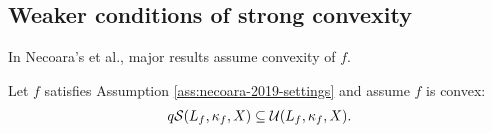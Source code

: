 \documentclass[12pt]{report}
\begin{document}
        \subsection{Weaker conditions of strong convexity}
            In Necoara's et al., major results assume convexity of $f$. 
            \begin{theorem}\label{thm:qscnvx-means-qua}
                Let $f$ satisfies Assumption \ref{ass:necoara-2019-settings} and assume $f$ is convex: 
                \begin{align*}
                    q\mathcal{S}(L_f, \kappa_f, X) \subseteq \mathcal U (L_f, \kappa_f, X). 
                \end{align*}
            \end{theorem}
\end{document}

